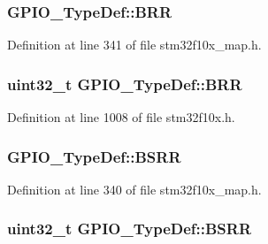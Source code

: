 \subsubsection[{\texorpdfstring{B\+RR}{BRR}}]{ G\+P\+I\+O\+\_\+\+Type\+Def\+::\+B\+RR}\hypertarget{struct_g_p_i_o___type_def_a48ec6ad5691ca7969e46823a71e14745}{}\label{struct_g_p_i_o___type_def_a48ec6ad5691ca7969e46823a71e14745}


Definition at line 341 of file stm32f10x\+\_\+map.\+h.

\subsubsection[{\texorpdfstring{B\+RR}{BRR}}]{ {\bf uint32\+\_\+t} G\+P\+I\+O\+\_\+\+Type\+Def\+::\+B\+RR}\hypertarget{struct_g_p_i_o___type_def_aab918bfbfae459789db1fd0b220c7f21}{}\label{struct_g_p_i_o___type_def_aab918bfbfae459789db1fd0b220c7f21}


Definition at line 1008 of file stm32f10x.\+h.

\subsubsection[{\texorpdfstring{B\+S\+RR}{BSRR}}]{ G\+P\+I\+O\+\_\+\+Type\+Def\+::\+B\+S\+RR}\hypertarget{struct_g_p_i_o___type_def_a556de0261a76d1d76bc18a9c6167ae55}{}\label{struct_g_p_i_o___type_def_a556de0261a76d1d76bc18a9c6167ae55}


Definition at line 340 of file stm32f10x\+\_\+map.\+h.

\subsubsection[{\texorpdfstring{B\+S\+RR}{BSRR}}]{ {\bf uint32\+\_\+t} G\+P\+I\+O\+\_\+\+Type\+Def\+::\+B\+S\+RR}\hypertarget{struct_g_p_i_o___type_def_acd6f21e08912b484c030ca8b18e11cd6}{}\label{struct_g_p_i_o___type_def_acd6f21e08912b484c030ca8b18e11cd6}


